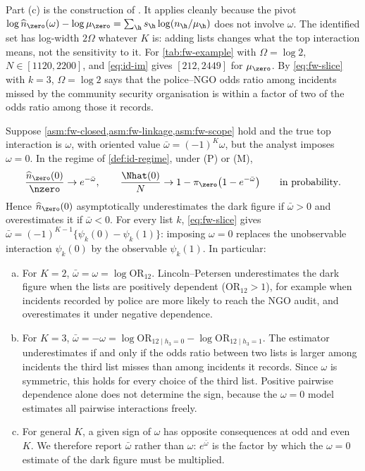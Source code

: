 Part (c) is the construction of \citet{imbens2004} \citep[see also][]{manski2003}. It applies cleanly because the pivot $\log\widehat n_{\zero}(\omega)-\log\mu_{\zero}=\sum_{\h}s_{\h}\log(n_{\h}/\mu_{\h})$ does not involve $\omega$. The identified set has log-width $2\Omega$ whatever $K$ is: adding lists changes what the top interaction means, not the sensitivity to it. For \cref{tab:fw-example} with $\Omega=\log 2$, $N\in[1120,2200]$, and \eqref{eq:id-im} gives $[212,2449]$ for $\mu_{\zero}$. By \eqref{eq:fw-slice} with $k=3$, $\Omega=\log2$ says that the police--NGO odds ratio among incidents missed by the community security organisation is within a factor of two of the odds ratio among those it records.

\begin{proposition}\label{prop:direction}
Suppose \cref{asm:fw-closed,asm:fw-linkage,asm:fw-scope} hold and the true top interaction is $\omega$, with oriented value $\bar\omega=(-1)^K\omega$, but the analyst imposes $\omega=0$. In the regime of \cref{def:id-regime}, under (P) or (M),
\begin{equation}\label{eq:id-direction}
  \frac{\widehat n_{\zero}(0)}{\nzero}\to e^{-\bar\omega},
  \qquad
  \frac{\Nhat(0)}{N}\to1-\pi_{\zero}\bigl(1-e^{-\bar\omega}\bigr)
  \qquad\text{in probability}.
\end{equation}
Hence $\widehat n_{\zero}(0)$ asymptotically underestimates the dark figure if $\bar\omega>0$ and overestimates it if $\bar\omega<0$. For every list $k$, \eqref{eq:fw-slice} gives $\bar\omega=(-1)^{K-1}\{\psi_k(0)-\psi_k(1)\}$: imposing $\omega=0$ replaces the unobservable interaction $\psi_k(0)$ by the observable $\psi_k(1)$. In particular:
\begin{enumerate}[(a)]
  \item For $K=2$, $\bar\omega=\omega=\log\mathrm{OR}_{12}$. Lincoln--Petersen underestimates the dark figure when the lists are positively dependent ($\mathrm{OR}_{12}>1$), for example when incidents recorded by police are more likely to reach the NGO audit, and overestimates it under negative dependence.
  \item For $K=3$, $\bar\omega=-\omega=\log\mathrm{OR}_{12\mid h_3=0}-\log\mathrm{OR}_{12\mid h_3=1}$. The estimator underestimates if and only if the odds ratio between two lists is larger among incidents the third list misses than among incidents it records. Since $\omega$ is symmetric, this holds for every choice of the third list. Positive pairwise dependence alone does not determine the sign, because the $\omega=0$ model estimates all pairwise interactions freely.
  \item For general $K$, a given sign of $\omega$ has opposite consequences at odd and even $K$. We therefore report $\bar\omega$ rather than $\omega$: $e^{\bar\omega}$ is the factor by which the $\omega=0$ estimate of the dark figure must be multiplied.
\end{enumerate}
\end{proposition}

